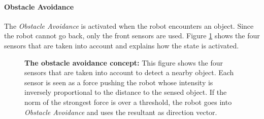 \documentclass[oneside, a4paper, 12pt]{memoir}
\let\oldCaption\caption
\renewcommand{\caption}[2]{
\oldCaption[#1]{{\small\sffamily\bfseries #1:} #2}
}
\begin{document}
			\paragraph{Obstacle Avoidance}
			
			The \emph{Obstacle Avoidance} is activated when the robot encounters an object. Since the robot cannot go back, only the front sensors are used. Figure \ref{fig:obstacle_avoidance} shows the four sensors that are taken into account and explains how the state is activated.
			
			\begin{figure}[!htp]\centering
				
				\caption{The obstacle avoidance concept}{This figure shows the four sensors that are taken into account to detect a nearby object. Each sensor is seen as a force pushing the robot whose intensity is inversely proportional to the distance to the sensed object. If the norm of the strongest force is over a threshold, the robot goes into \emph{Obstacle Avoidance} and uses the resultant as direction vector.}
				\label{fig:obstacle_avoidance}
				\end{figure}
			
\end{document}
